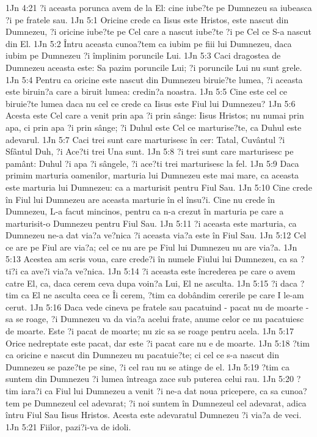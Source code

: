 1Jn 4:21  ?i aceasta porunca avem de la El: cine iube?te pe Dumnezeu sa iubeasca ?i pe fratele sau.
1Jn 5:1  Oricine crede ca Iisus este Hristos, este nascut din Dumnezeu, ?i oricine iube?te pe Cel care a nascut iube?te ?i pe Cel ce S-a nascut din El.
1Jn 5:2  Întru aceasta cunoa?tem ca iubim pe fiii lui Dumnezeu, daca iubim pe Dumnezeu ?i împlinim poruncile Lui.
1Jn 5:3  Caci dragostea de Dumnezeu aceasta este: Sa pazim poruncile Lui; ?i poruncile Lui nu sunt grele.
1Jn 5:4  Pentru ca oricine este nascut din Dumnezeu biruie?te lumea, ?i aceasta este biruin?a care a biruit lumea: credin?a noastra.
1Jn 5:5  Cine este cel ce biruie?te lumea daca nu cel ce crede ca Iisus este Fiul lui Dumnezeu?
1Jn 5:6  Acesta este Cel care a venit prin apa ?i prin sânge: Iisus Hristos; nu numai prin apa, ci prin apa ?i prin sânge; ?i Duhul este Cel ce marturise?te, ca Duhul este adevarul.
1Jn 5:7  Caci trei sunt care marturisesc în cer: Tatal, Cuvântul ?i Sfântul Duh, ?i Ace?ti trei Una sunt.
1Jn 5:8  ?i trei sunt care marturisesc pe pamânt: Duhul ?i apa ?i sângele, ?i ace?ti trei marturisesc la fel.
1Jn 5:9  Daca primim marturia oamenilor, marturia lui Dumnezeu este mai mare, ca aceasta este marturia lui Dumnezeu: ca a marturisit pentru Fiul Sau.
1Jn 5:10  Cine crede în Fiul lui Dumnezeu are aceasta marturie în el însu?i. Cine nu crede în Dumnezeu, L-a facut mincinos, pentru ca n-a crezut în marturia pe care a marturisit-o Dumnezeu pentru Fiul Sau.
1Jn 5:11  ?i aceasta este marturia, ca Dumnezeu ne-a dat via?a ve?nica ?i aceasta via?a este în Fiul Sau.
1Jn 5:12  Cel ce are pe Fiul are via?a; cel ce nu are pe Fiul lui Dumnezeu nu are via?a.
1Jn 5:13  Acestea am scris voua, care crede?i în numele Fiului lui Dumnezeu, ca sa ?ti?i ca ave?i via?a ve?nica.
1Jn 5:14  ?i aceasta este încrederea pe care o avem catre El, ca, daca cerem ceva dupa voin?a Lui, El ne asculta.
1Jn 5:15  ?i daca ?tim ca El ne asculta ceea ce Îi cerem, ?tim ca dobândim cererile pe care I le-am cerut.
1Jn 5:16  Daca vede cineva pe fratele sau pacatuind - pacat nu de moarte - sa se roage, ?i Dumnezeu va da via?a acelui frate, anume celor ce nu pacatuiesc de moarte. Este ?i pacat de moarte; nu zic sa se roage pentru acela.
1Jn 5:17  Orice nedreptate este pacat, dar este ?i pacat care nu e de moarte.
1Jn 5:18  ?tim ca oricine e nascut din Dumnezeu nu pacatuie?te; ci cel ce s-a nascut din Dumnezeu se paze?te pe sine, ?i cel rau nu se atinge de el.
1Jn 5:19  ?tim ca suntem din Dumnezeu ?i lumea întreaga zace sub puterea celui rau.
1Jn 5:20  ?tim iara?i ca Fiul lui Dumnezeu a venit ?i ne-a dat noua pricepere, ca sa cunoa?tem pe Dumnezeul cel adevarat; ?i noi suntem în Dumnezeul cel adevarat, adica întru Fiul Sau Iisus Hristos. Acesta este adevaratul Dumnezeu ?i via?a de veci.
1Jn 5:21  Fiilor, pazi?i-va de idoli.


